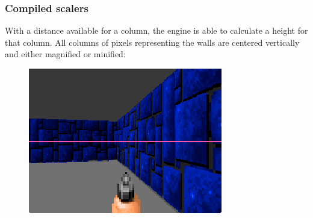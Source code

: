 \subsubsection{Compiled scalers}
With a distance available for a column, the engine is able to calculate a height for that column. All columns of pixels representing the walls are centered vertically and either magnified or minified:\\
\par
 \begin{figure}[H]
\centering
 \includegraphics[width=\textwidth]{screenshots/scaler_valign.png}
 \end{figure}
\par

